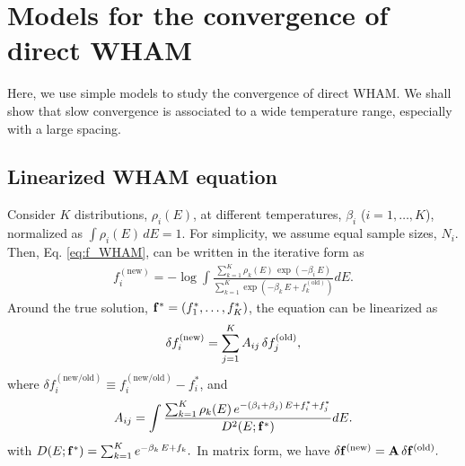 \documentclass[reprint,aip,jcp,superscriptaddress]{revtex4-1}
\begin{document}
\section{\label{sec:convwham}
Models for the convergence of direct WHAM}




Here, we use simple models
to study the convergence of direct WHAM.
%
We shall show that
slow convergence is
associated to a wide temperature range,
especially with a large spacing.





\subsection{Linearized WHAM equation}



Consider $K$ distributions, $\rho_i(E)$,
at different temperatures,
$\beta_i$ ($i = 1, \dots, K$),
%
normalized as
%
$
\int \rho_i(E) \, dE = 1.
$
%
%
%
For simplicity,
we assume equal sample sizes, $N_i$.
%
Then,
Eq. \eqref{eq:f_WHAM},
can be written
in the iterative form as
%
\begin{align}
f_i^\mathrm{(new)}
=
-\log
\int
\frac
{
  \sum_{k=1}^K \rho_k(E) \, \exp(-\beta_i \, E)
}
{
  \sum_{k=1}^K
  \exp(
    -\beta_k \, E + f_k^\mathrm{(old)}
  )
}
dE.
\label{eq:f_WHAM1}
\end{align}
%
Around the true solution,
$\mathbf{f}^* = (f_1^*, \dots, f_K^*)$,
the equation can be linearized as
%
\begin{align}
\delta f_i^\mathrm{(new)}
=
\sum_{j = 1}^K
A_{ij} \,
\delta f_j^\mathrm{(old)},
\notag
\end{align}
%
where
%
$\delta f_i^\mathrm{(new/old)}
\equiv f_i^\mathrm{(new/old)} - f_i^*$,
%
and
\begin{align}
  A_{ij}
=
\int
\frac
{
  \sum_{k=1}^K \rho_k(E) \,
    e^{
      -(\beta_i + \beta_j) \, E + f_i^* + f_j^*
    }
}
{
  D^2(E; \mathbf{f}^*)
}
dE.
\label{eq:Aij}
\end{align}
%
with
$
D(E; \mathbf{f}^*)
=
\sum_{k = 1}^K
  e^{
    -\beta_k \, E + f_k
  }.
$
%
In matrix form, we have
%
$
\delta \mathbf{f}^\mathrm{(new)}
=
\mathbf{A} \,
\delta \mathbf{f}^\mathrm{(old)}.
$
\end{document}
